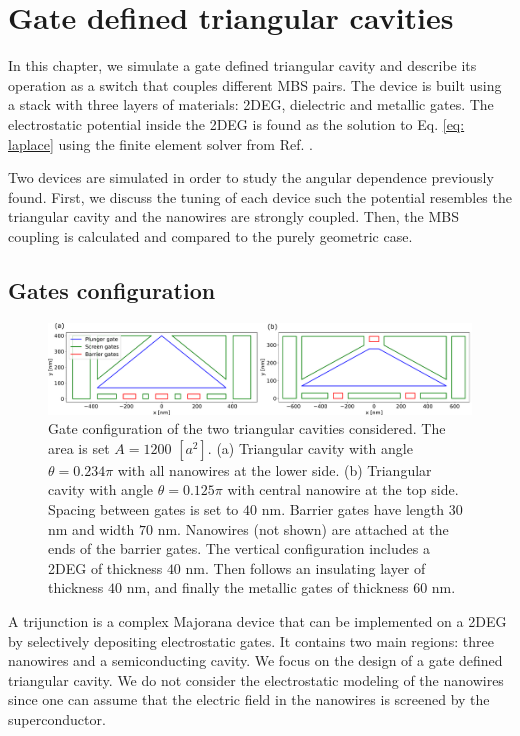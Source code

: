 \chapter{Gate defined triangular cavities}

In this chapter, we simulate a gate defined triangular cavity and describe its operation as a switch that couples different MBS pairs.
The device is built using a stack with three layers of materials: 2DEG, dielectric and metallic gates.
The electrostatic potential inside the 2DEG is found as the solution to Eq. \eqref{eq: laplace} using the finite element solver from Ref. .

Two devices are simulated in order to study the angular dependence previously found.
First, we discuss the tuning of each device such the potential resembles the triangular cavity and the nanowires are strongly coupled.
Then, the MBS coupling is calculated and compared to the purely geometric case.

\section{Gates configuration}

\begin{figure}[h!]
\centering
  \includegraphics[width=\linewidth]{figures/gate_configurations.pdf}
  \caption{Gate configuration of the two triangular cavities considered. The area is set $A=1200$ $[a^2]$. (a) Triangular cavity with angle $\theta = 0.234 \pi$ with all nanowires at the lower side. (b) Triangular cavity with angle $\theta = 0.125\pi$ with central nanowire at the top side. Spacing between gates is set to $40$ nm. Barrier gates have length $30$ nm and width $70$ nm. Nanowires (not shown) are attached at the ends of the barrier gates. The vertical configuration includes a 2DEG of thickness $40$ nm. Then follows an insulating layer of thickness $40$ nm, and finally the metallic gates of thickness $60$ nm.}
  \label{fig:gates}
\end{figure}

A trijunction is a complex Majorana device that can be implemented on a 2DEG by selectively depositing electrostatic gates.
It contains two main regions: three nanowires and a semiconducting cavity.
We focus on the design of a gate defined triangular cavity.
We do not consider the electrostatic modeling of the nanowires since one can assume that the electric field in the nanowires is screened by the superconductor.

